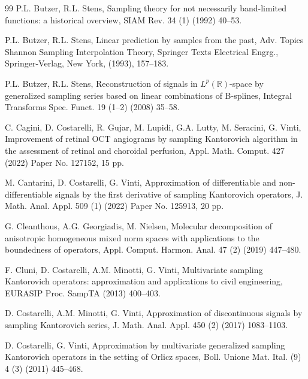\documentclass[11pt, a4paper]{article}
\theoremstyle{definition}
\numberwithin{equation}{section}
\def\RR{\mathbb R}
\begin{document}
\begin{thebibliography}{99}
 P.L. Butzer, R.L. Stens, Sampling theory for not necessarily band-limited functions: a historical overview, SIAM Rev. 34 (1) (1992) 40–53.

 P.L. Butzer, R.L. Stens, Linear prediction by samples from the past, Adv. Topics Shannon Sampling Interpolation Theory, Springer Texts Electrical Engrg., Springer-Verlag, New York, (1993), 157–183.

 P.L. Butzer, R.L. Stens, Reconstruction of signals in $L^p(\RR)$-space by generalized sampling series based on linear combinations of B-splines, Integral Transforms Spec. Funct. 19 (1–2) (2008) 35–58.

 C. Cagini, D. Costarelli, R. Gujar, M. Lupidi, G.A. Lutty, M. Seracini, G. Vinti, Improvement of retinal OCT angiograms by sampling Kantorovich algorithm in the assessment of retinal and choroidal perfusion, Appl. Math. Comput. 427 (2022) Paper No. 127152, 15 pp.

 M. Cantarini, D. Costarelli, G. Vinti, Approximation of differentiable and non-differentiable signals by the first derivative of sampling Kantorovich operators, J. Math. Anal. Appl. 509 (1) (2022) Paper No. 125913, 20 pp.

 G. Cleanthous, A.G. Georgiadis, M. Nielsen, Molecular decomposition of anisotropic homogeneous mixed norm spaces with applications to the boundedness of operators, Appl. Comput. Harmon. Anal. 47 (2) (2019) 447–480.

 F. Cluni, D. Costarelli, A.M. Minotti, G. Vinti, Multivariate sampling Kantorovich operators: approximation and applications to civil engineering, EURASIP Proc. SampTA (2013) 400–403.

 D. Costarelli, A.M. Minotti, G. Vinti, Approximation of discontinuous signals by sampling Kantorovich series, J. Math. Anal. Appl. 450 (2) (2017) 1083–1103.

 D. Costarelli, G. Vinti, Approximation by multivariate generalized sampling Kantorovich operators in the setting of Orlicz spaces, Boll. Unione Mat. Ital. (9) 4 (3) (2011) 445–468.




\end{thebibliography}
\end{document}
